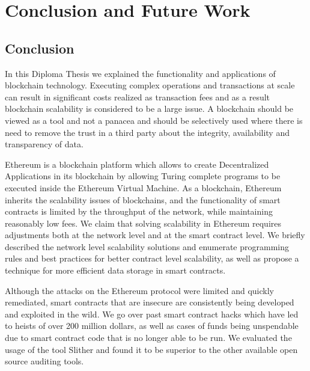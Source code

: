 \chapter{Conclusion and Future Work}\label{ch:conclusion}

\section{Conclusion}
In this Diploma Thesis we explained the functionality and applications of blockchain technology. Executing complex operations and transactions at scale can result in significant costs realized as transaction fees and as a result blockchain scalability is considered to be a large issue. A blockchain should be viewed as a tool and not a panacea and should be selectively used where there is need to remove the trust in a third party about the integrity, availability and transparency of data. 

Ethereum is a blockchain platform which allows to create Decentralized Applications in its blockchain by allowing Turing complete programs to be executed inside the Ethereum Virtual Machine. As a blockchain, Ethereum inherits the scalability issues of blockchains, and the functionality of smart contracts is limited by the throughput of the network, while maintaining reasonably low fees. We claim that solving scalability in Ethereum requires adjustments both at the network level and at the smart contract level. We briefly described the network level scalability solutions and enumerate programming rules and best practices for better contract level scalability, as well as propose a technique for more efficient data storage in smart contracts.

Although the attacks on the Ethereum protocol were limited and quickly remediated, smart contracts that are insecure are consistently being developed and exploited in the wild. We go over past smart contract hacks which have led to heists of over 200 million dollars, as well as cases of funds being unspendable due to smart contract code that is no longer able to be run. We evaluated the usage of the tool Slither and found it to be superior to the other available open source auditing tools. 


